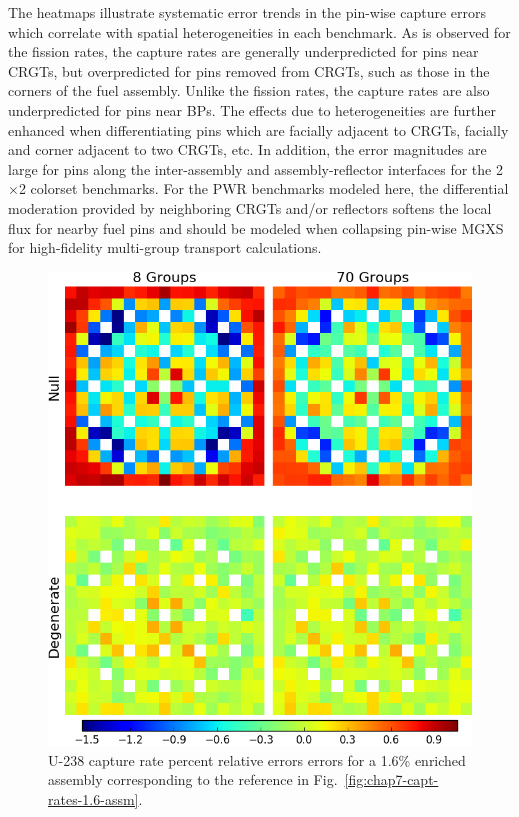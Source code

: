 The heatmaps illustrate systematic error trends in the pin-wise capture errors which correlate with spatial heterogeneities in each benchmark. As is observed for the fission rates, the capture rates are generally underpredicted for pins near \acp{CRGT}, but overpredicted for pins removed from \acp{CRGT}, such as those in the corners of the fuel assembly. Unlike the fission rates, the capture rates are also underpredicted for pins near \acp{BP}. The effects due to heterogeneities are further enhanced when differentiating pins which are facially adjacent to \acp{CRGT}, facially and corner adjacent to two \acp{CRGT}, etc. In addition, the error magnitudes are large for pins along the inter-assembly and assembly-reflector interfaces for the 2$\times$2 colorset benchmarks. For the \ac{PWR} benchmarks modeled here, the differential moderation provided by neighboring \acp{CRGT} and/or reflectors softens the local flux for nearby fuel pins and should be modeled when collapsing pin-wise \ac{MGXS} for high-fidelity multi-group transport calculations.

\begin{figure}[h!]
\centering
\includegraphics[width=\linewidth]{figures/quantification/assm-16/capt-err}
\vspace{2mm}
\caption[U-238 capture rate errors for a 1.6\% enriched assembly]{U-238 capture rate percent relative errors errors for a 1.6\% enriched assembly corresponding to the reference in Fig.~\ref{fig:chap7-capt-rates-1.6-assm}.}
\label{fig:chap8-assm-1.6-capt-err}
\end{figure}

